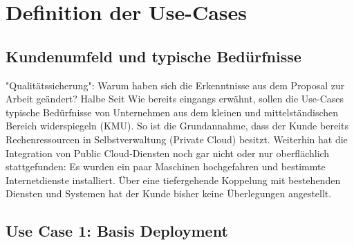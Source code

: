 \chapter{Definition der Use-Cases} \label{Umsetzung der Use-Cases und Evaluation}

\section{Kundenumfeld und typische Bedürfnisse} \label{Kundenumfeld und typische Bedürfnisse}


"Qualitätssicherung": Warum haben sich die Erkenntnisse aus dem Proposal zur Arbeit geändert? Halbe Seit
Wie bereits eingangs erwähnt, sollen die Use-Cases typische Bedürfnisse von Unternehmen aus dem kleinen und mittelständischen Bereich widerspiegeln (KMU). So ist die Grundannahme, dass der Kunde bereits Rechenressourcen in Selbstverwaltung (\glqq Private Cloud\grqq{}) besitzt. Weiterhin hat die Integration von Public Cloud-Diensten noch gar nicht oder nur oberflächlich stattgefunden: Es wurden ein paar Maschinen hochgefahren und bestimmte Internetdienste installiert. Über eine tiefergehende Koppelung mit bestehenden Diensten und Systemen hat der Kunde bisher keine Überlegungen angestellt. %


\section{Use Case 1: Basis Deployment}


